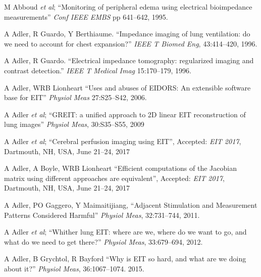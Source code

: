 \documentclass[12pt]{article} \usepackage[margin=3cm]{geometry} \usepackage[margin=20pt,font=small,labelfont=bf]{caption}\def\TBLWIDA{35mm}\def\TBLWIDB{95mm}
\newcommand{\ifmaxthree}[2]{#2 {\em et al}; }
\begin{document}
\begin{thebibliography}{00}
      \setlength{\parskip}{0ex}%
      \setlength{\itemsep}{0ex}%
\ifmaxthree{
M Abboud, R Guardo, R Martineau, J Taillefer, C  Pelletier, 
}{
M Abboud
}
``Monitoring of peripheral edema using electrical bioimpedance measurements''
{\em Conf IEEE EMBS} pp 641--642, 1995.

A Adler, R Guardo, Y Berthiaume. 
``Impedance imaging of lung ventilation: do we need to account for chest expansion?''
{\em  IEEE T Biomed Eng}, 43:414--420, 1996.

A Adler, R Guardo.
``Electrical impedance tomography: regularized imaging and contrast detection.''
{\em IEEE T Medical Imag} 15:170--179, 1996.

A Adler, WRB Lionheart
``Uses and abuses of EIDORS: An extensible software base for EIT''
{\em Physiol Meas} 27:S25--S42, 2006.

\ifmaxthree{
A Adler, JH Arnold, R Bayford, A Borsic, B Brown, P Dixon, TJC Faes, I Frerichs, H Gagnon, Y Gärber, B Grychtol, G Hahn, WRB Lionheart, A Malik, RP Patterson, J Stocks, A Tizzard, N Weiler, GK Wolf
}{
A Adler
}
``GREIT: a unified approach to 2D linear EIT reconstruction of lung images''
{\em Physiol Meas}, 30:S35--S55, 2009


\ifmaxthree{
A Adler, M Faulkner, K Aristovich, S Hannan, J Avery, DS Holder
}{
A Adler
}
``Cerebral perfusion imaging using EIT'',
Accepted: {\em EIT 2017}, Dartmouth, NH, USA, June 21--24, 2017

A Adler, A Boyle, WRB Lionheart
``Efficient computations of the Jacobian matrix using different
approaches are equivalent'',
Accepted: {\em EIT 2017}, Dartmouth, NH, USA, June 21--24, 2017


A Adler, PO Gaggero, Y Maimaitijiang,
``Adjacent Stimulation and Measurement Patterns Considered Harmful''
{\em Physiol Meas}, 32:731--744, 2011.


\ifmaxthree{
A Adler, MB Amato, JH Arnold, R Bayford, M Bodenstein, SH Böhm, BH Brown, I Frerichs, O Stenqvist, N Weiler, GK Wolf,
}{
A Adler
}
``Whither lung EIT: where are we, where do we want to go, and what do we need to get there?''
{\em Physiol Meas}, 33:679--694, 2012. 

A Adler, B Grychtol, R Bayford
``Why is EIT so hard, and what are we doing about it?''
{\em Physiol Meas}, 36:1067--1074. 2015.


\end{thebibliography}
\end{document}
